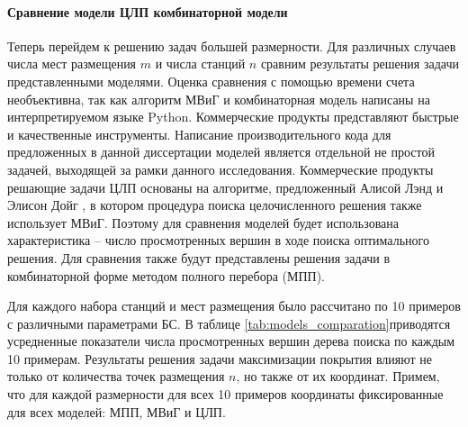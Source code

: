 \paragraph{Сравнение модели ЦЛП комбинаторной модели}

Теперь перейдем к решению задач большей размерности. Для различных случаев числа мест размещения $m$ и числа станций $n$ сравним результаты решения задачи представленными моделями. Оценка сравнения с помощью времени счета необъективна, так как алгоритм МВиГ и комбинаторная модель написаны на интерпретируемом языке Python. Коммерческие продукты представляют быстрые и качественные инструменты. Написание производительного кода для предложенных в данной диссертации моделей является отдельной не простой задачей, выходящей за рамки данного исследования. Коммерческие продукты решающие задачи ЦЛП основаны на алгоритме, предложенный Алисой Лэнд и Элисон Дойг \cite{Land1960}, в котором процедура поиска целочисленного решения также использует МВиГ.  Поэтому для сравнения моделей будет использована характеристика -- число просмотренных вершин в ходе поиска оптимального решения. Для сравнения также будут представлены решения задачи в комбинаторной форме методом полного перебора (МПП).

Для каждого набора станций и мест размещения было рассчитано по 10 примеров с различными параметрами БС. В таблице \cref{tab:models_comparation}приводятся усредненные показатели числа просмотренных вершин дерева поиска по каждым 10 примерам. Результаты решения задачи максимизации покрытия влияют не только от количества точек размещения $n$, но также от их координат. Примем, что для каждой размерности для всех 10 примеров координаты фиксированные для всех моделей: МПП, МВиГ и ЦЛП. 


